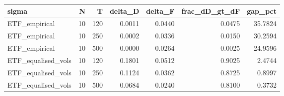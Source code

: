 \begin{tabular}{lrrrrrr}
\toprule
sigma & N & T & delta_D & delta_F & frac_dD_gt_dF & gap_pct \\
\midrule
ETF_empirical & 10 & 120 & 0.0011 & 0.0440 & 0.0475 & 35.7824 \\
ETF_empirical & 10 & 250 & 0.0002 & 0.0336 & 0.0150 & 30.2594 \\
ETF_empirical & 10 & 500 & 0.0000 & 0.0264 & 0.0025 & 24.9596 \\
ETF_equalised_vols & 10 & 120 & 0.1801 & 0.0512 & 0.9025 & 2.4744 \\
ETF_equalised_vols & 10 & 250 & 0.1124 & 0.0362 & 0.8725 & 0.8997 \\
ETF_equalised_vols & 10 & 500 & 0.0684 & 0.0240 & 0.8100 & 0.3732 \\
\bottomrule
\end{tabular}
